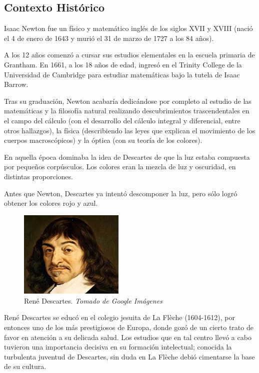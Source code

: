 \documentclass[journal]{IEEEtran}
\begin{document}
\subsection{Contexto Histórico}

Isaac Newton fue un físico y matemático inglés de los siglos XVII y XVIII (nació el 4 de enero de 1643 y murió el 31 de marzo de 1727 a los 84 años).

A los 12 años comenzó a cursar sus estudios elementales en la escuela primaria de Grantham. En 1661, a los 18 años de edad, ingresó en el Trinity College de la Universidad de Cambridge para estudiar matemáticas bajo la tutela de Isaac Barrow.

Tras su graduación, Newton acabaría dedicándose por completo al estudio de las matemáticas y la filosofía natural realizando descubrimientos trascendentales en el campo del cálculo (con el desarrollo del cálculo integral y diferencial, entre otros hallazgos), la física (describiendo las leyes que explican el movimiento de los cuerpos macroscópicos) y la óptica (con su teoría de los colores).

En aquella época dominaba la idea de Descartes de que la luz estaba compuesta por pequeños corpúsculos. Los colores eran la mezcla de luz y oscuridad, en distintas proporciones.

Antes que Newton, Descartes ya intentó descomponer la luz, pero sólo logró obtener los colores rojo y azul.

\begin{center}
  \begin{figure}[h!]
  \includegraphics[width=50mm]{descartes.jpg}
  \caption{René Descartes. \emph{Tomado de Google Imágenes}}
  \end{figure}
\end{center}

René Descartes se educó en el colegio jesuita de La Flèche (1604-1612), por entonces uno de los más prestigiosos de Europa, donde gozó de un cierto trato de favor en atención a su delicada salud. Los estudios que en tal centro llevó a cabo tuvieron una importancia decisiva en su formación intelectual; conocida la turbulenta juventud de Descartes, sin duda en La Flèche debió cimentarse la base de su cultura. 
\end{document}

